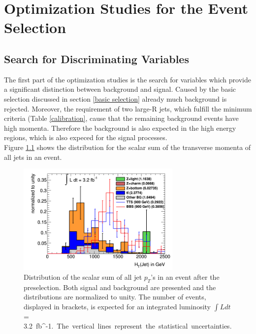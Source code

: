 \chapter{Optimization Studies for the Event Selection}

\section{Search for Discriminating Variables }
\label{distributions}
The first part of the optimization studies is the search for variables which provide a significant distinction between background and signal.
Caused by the basic selection discussed in section \ref{basic selection} already much background is rejected.
Moreover, the requirement of two large-R jets, which fulfill the minimum criteria (Table \ref{calibration}, cause that the remaining background events have high momenta.
Therefore the background is also expected in the high energy regions, which is also expeced for the signal processes.\\
Figure \ref{H_T} shows the distribution for the scalar sum of the transverse momenta of all jets in an event.

\begin{figure}
\centering
\includegraphics[width=8cm]{figures/H_T.png}
\caption{Distribution of the scalar sum of all jet $p_{T}$'s in an event after the preselection. 
Both signal and background are presented and the distributions are normalized to unity. 
The number of events, displayed in brackets, is expected for an integrated luminosity $\int L dt$ = \SI{3.2}{fb^{-1}.}
The vertical lines represent the statistical uncertainties.}
\label{H_T}
\end{figure}

